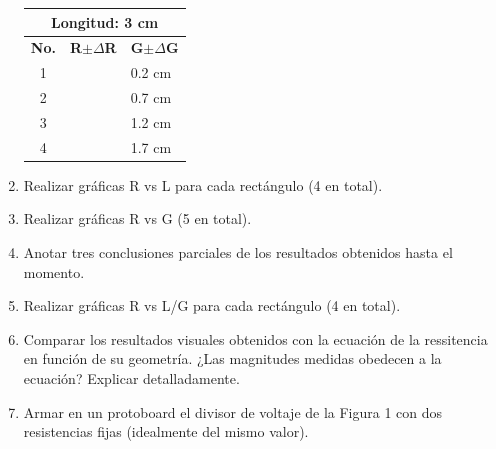 \documentclass[letterpaper, 12 pt, conference]{ieeeconf}  %
\begin{document}
\begin{enumerate}
\begin{table}[h!]
\centering
\begin{tabular}{|c|l|l|}
\hline
\multicolumn{3}{|c|}{Longitud: 3 cm}                                                                                 \\ \hline
\multicolumn{1}{|l|}{\textbf{No.}} & \textbf{R$\pm \Delta$R} & \textbf{G$\pm \Delta$G} \\ \hline
1                                  &                         & 0.2 cm                                                \\ \hline
2                                  &                         & 0.7 cm                                                \\ \hline
3                                  &                         & 1.2 cm                                                \\ \hline
4                                  &                         & 1.7 cm                                                \\ \hline
\end{tabular}
\end{table}

    \item Realizar gráficas R vs L para cada rectángulo (4 en total).
    \item Realizar gráficas R vs G (5 en total).
    \item Anotar tres conclusiones parciales de los resultados obtenidos hasta el momento.
    \item Realizar gráficas R vs L/G para cada rectángulo (4 en total).
    \item Comparar los resultados visuales obtenidos con la ecuación de la ressitencia en función de su geometría. ¿Las magnitudes medidas obedecen a la ecuación? Explicar detalladamente.
    \item Armar en un protoboard el divisor de voltaje de la Figura 1 con dos resistencias fijas (idealmente del mismo valor).


\end{enumerate}
\end{document}
